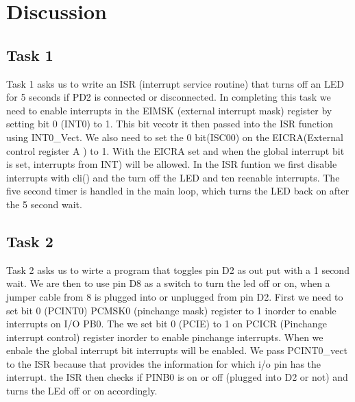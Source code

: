 \section{Discussion}
\subsection{Task 1}
Task 1 asks us to write an ISR (interrupt service routine) that turns off an LED for 5 seconds if PD2 is connected or disconnected. In completing this task we need to enable interrupts in the EIMSK (external interrupt mask) register by setting bit 0 (INT0) to 1. This bit vecotr it then passed into the ISR function using INT0\_Vect. We also need to set the 0 bit(ISC00) on the EICRA(External control register A ) to 1. With the EICRA set and when the global interrupt bit is set, interrupts from INT) will be allowed. In the ISR funtion we first disable interrupts with cli() and the turn off the LED and ten reenable interrupts. The five second timer is handled in the main loop, which turns the LED back on after the 5 second wait.
\subsection{Task 2}
Task 2 asks us to wirte a program that toggles pin D2 as out put with a 1 second wait. We are then to use pin D8 as a switch to turn the led off or on, when a jumper cable from 8 is plugged into or unplugged from pin D2. 
First we need to set bit 0 (PCINT0) PCMSK0 (pinchange mask) register to 1 inorder to enable interrupts on I/O PB0. The we set bit 0 (PCIE) to 1 on PCICR (Pinchange interrupt control) register inorder to enable pinchange interrupts. When we enbale the global interrupt bit interrupts will be enabled. We pass PCINT0\_vect to the ISR because that provides the information for which i/o pin has the interrupt.
the ISR then checks if PINB0 is on or off (plugged into D2 or not)  and turns the LEd off or on accordingly. 


